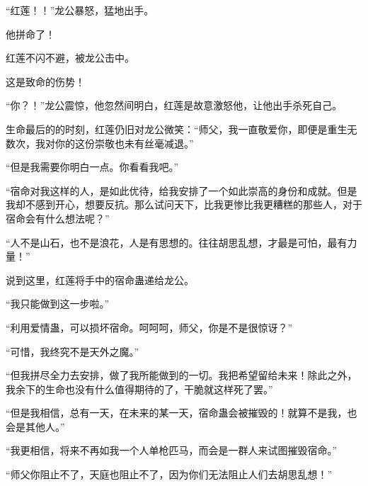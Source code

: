 \begin{this_body}
“红莲！！”龙公暴怒，猛地出手。

他拼命了！

红莲不闪不避，被龙公击中。

这是致命的伤势！

“你？！”龙公震惊，他忽然间明白，红莲是故意激怒他，让他出手杀死自己。

生命最后的的时刻，红莲仍旧对龙公微笑：“师父，我一直敬爱你，即便是重生无数次，我对你的这份崇敬也未有丝毫减退。”

“但是我需要你明白一点。你看看我吧。”

“宿命对我这样的人，是如此优待，给我安排了一个如此崇高的身份和成就。但是我却不感到开心，想要反抗。那么试问天下，比我更惨比我更糟糕的那些人，对于宿命会有什么想法呢？”

“人不是山石，也不是浪花，人是有思想的。往往胡思乱想，才最是可怕，最有力量！”

说到这里，红莲将手中的宿命蛊递给龙公。

“我只能做到这一步啦。”

“利用爱情蛊，可以损坏宿命。呵呵呵，师父，你是不是很惊讶？”

“可惜，我终究不是天外之魔。”

“但我拼尽全力去安排，做了我所能做到的一切。我把希望留给未来！除此之外，我余下的生命也没有什么值得期待的了，干脆就这样死了罢。”

“但是我相信，总有一天，在未来的某一天，宿命蛊会被摧毁的！就算不是我，也会是其他人。”

“我更相信，将来不再如我一个人单枪匹马，而会是一群人来试图摧毁宿命。”

“师父你阻止不了，天庭也阻止不了，因为你们无法阻止人们去胡思乱想！”

\end{this_body}

